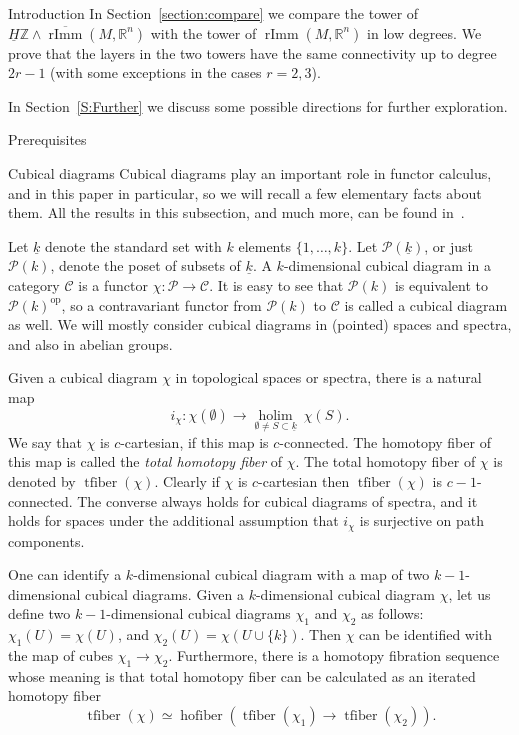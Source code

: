 \documentclass[12pt]{amsart}
\newcommand{\R}{{\mathbb R}}
\newcommand{\Z}{{\mathbb Z}}
\newcommand{\hofiber}{\operatorname{hofiber}}
\newcommand{\holim}{\operatorname{holim}}
\newcommand{\tfiber}{\operatorname{tfiber}}
\newcommand{\rImm}{\operatorname{rImm}}
\newcommand{\rbar}{\overline{\rImm}}
\newcommand{\HZ}{\underline{H}\Z}
\newcommand{\calC}{{\mathcal{C}}}
\newcommand{\calP}{{\mathcal{P}}}
\theoremstyle{plain}
\theoremstyle{definition}
\theoremstyle{remark}
\begin{document}
\begin{section}{Introduction}
In Section~\ref{section:compare} we compare the tower of $\HZ\wedge \rbar(M, \R^n)$ with the tower of $\rImm(M, \R^n)$ in low degrees. We prove that the layers in the two towers have the same connectivity up to degree $2r-1$ (with some exceptions in the cases $r=2, 3$).

In Section~\ref{S:Further} we discuss some possible directions for further exploration.

\end{section}

\vspace*{0.5cm}
\begin{section}{Prerequisites}\label{S:Prereq}
\begin{subsection}{Cubical diagrams}\label{SS:cubicaldiagrams}
Cubical diagrams play an important role in functor calculus, and in this paper in particular, so we will recall a few elementary facts about them. All the results in this subsection, and much more, can be found in~\cite{CalcII}.

Let $\underline{k}$ denote the standard set with $k$ elements $\{1, \ldots, k\}$. Let $\calP(\underline{k})$, or just $\calP(k)$, denote the poset of subsets of $\underline{k}$. A $k$-dimensional cubical diagram in a category $\calC$ is a functor $\chi\colon \calP\to \calC$. It is easy to see that $\calP(k)$ is equivalent to $\calP(k)^{\mathrm{op}}$, so a contravariant functor from $\calP(k)$ to $\calC$ is called a cubical diagram as well.
We will mostly consider cubical diagrams in (pointed) spaces and spectra, and also in abelian groups.

Given a cubical diagram $\chi$ in topological spaces or spectra, there is a natural map
\[
i_\chi\colon \chi(\emptyset)\to \underset{\emptyset \ne S\subset \underline{k}}{\holim} \ \chi(S).
\]
We say that $\chi$ is $c$-cartesian, if this map is $c$-connected. The homotopy fiber of this map is called the {\it total homotopy fiber} of $\chi$. The total homotopy fiber of $\chi$ is denoted by $\tfiber(\chi)$. Clearly if $\chi$ is $c$-cartesian then $\tfiber(\chi)$ is $c-1$-connected. The converse always holds for cubical diagrams of spectra, and it holds for spaces under the additional assumption that $i_\chi$ is surjective on path components.

One can identify a $k$-dimensional cubical diagram with a map of two $k-1$-dimensional cubical diagrams. Given a $k$-dimensional cubical diagram $\chi$, let us define two $k-1$-dimensional cubical diagrams $\chi_1$ and $\chi_2$ as follows: $\chi_1(U)=\chi(U)$, and $\chi_2(U)=\chi(U\cup \{k\})$. Then $\chi$ can be identified with the map of cubes $\chi_1\to \chi_2$. Furthermore, there is a homotopy fibration sequence whose meaning is that total homotopy fiber can be calculated as an iterated homotopy fiber
\[
\tfiber(\chi)\simeq \hofiber(\tfiber(\chi_1)\to \tfiber(\chi_2)).
\]


\end{subsection}
\end{section}
\end{document}
